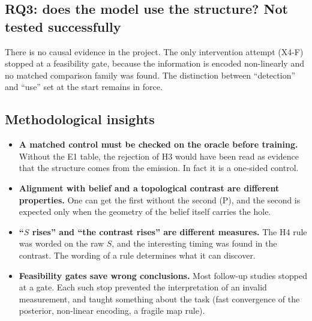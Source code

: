 \documentclass[12pt,a4paper]{article}
\newcommand{\en}[1]{\foreignlanguage{english}{#1}}   %
\begin{document}
\subsection{RQ3: does the model use the structure? Not tested successfully}
There is no causal evidence in the project. The only intervention attempt (\en{X4-F}) stopped at a feasibility gate, because the information is encoded non-linearly and no matched comparison family was found. The distinction between ``detection'' and ``use'' set at the start remains in force.

\subsection{Methodological insights}
\begin{itemize}[leftmargin=*]
\item \textbf{A matched control must be checked on the oracle before training.} Without the \en{E1} table, the rejection of H3 would have been read as evidence that the structure comes from the emission. In fact it is a one-sided control.
\item \textbf{Alignment with belief and a topological contrast are different properties.} One can get the first without the second (P), and the second is expected only when the geometry of the belief itself carries the hole.
\item \textbf{``$S$ rises'' and ``the contrast rises'' are different measures.} The H4 rule was worded on the raw $S$, and the interesting timing was found in the contrast. The wording of a rule determines what it can discover.
\item \textbf{Feasibility gates save wrong conclusions.} Most follow-up studies stopped at a gate. Each such stop prevented the interpretation of an invalid measurement, and taught something about the task (fast convergence of the posterior, non-linear encoding, a fragile map rule).
\end{itemize}

\end{document}
